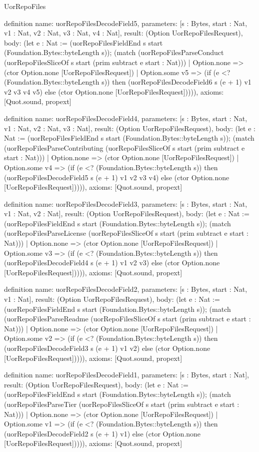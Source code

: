 \begin{lexlean}{UorRepoFiles}
\begin{semanticmodule}
definition{
  name: uorRepoFilesDecodeField5,
  parameters: [s : Bytes, start : Nat, v1 : Nat, v2 : Nat, v3 : Nat, v4 : Nat],
  result: (Option UorRepoFilesRequest),
  body: (let e : Nat := (uorRepoFilesFieldEnd s start (Foundation.Bytes::byteLength s)); (match (uorRepoFilesParseConduct (uorRepoFilesSliceOf s start (prim subtract e start : Nat)))
    | Option.none => (ctor Option.none [UorRepoFilesRequest])
    | Option.some v5 => (if (e <? (Foundation.Bytes::byteLength s)) then (uorRepoFilesDecodeField6 s (e + 1) v1 v2 v3 v4 v5) else (ctor Option.none [UorRepoFilesRequest])))),
  axioms: [Quot.sound, propext]
}

definition{
  name: uorRepoFilesDecodeField4,
  parameters: [s : Bytes, start : Nat, v1 : Nat, v2 : Nat, v3 : Nat],
  result: (Option UorRepoFilesRequest),
  body: (let e : Nat := (uorRepoFilesFieldEnd s start (Foundation.Bytes::byteLength s)); (match (uorRepoFilesParseContributing (uorRepoFilesSliceOf s start (prim subtract e start : Nat)))
    | Option.none => (ctor Option.none [UorRepoFilesRequest])
    | Option.some v4 => (if (e <? (Foundation.Bytes::byteLength s)) then (uorRepoFilesDecodeField5 s (e + 1) v1 v2 v3 v4) else (ctor Option.none [UorRepoFilesRequest])))),
  axioms: [Quot.sound, propext]
}

definition{
  name: uorRepoFilesDecodeField3,
  parameters: [s : Bytes, start : Nat, v1 : Nat, v2 : Nat],
  result: (Option UorRepoFilesRequest),
  body: (let e : Nat := (uorRepoFilesFieldEnd s start (Foundation.Bytes::byteLength s)); (match (uorRepoFilesParseLicense (uorRepoFilesSliceOf s start (prim subtract e start : Nat)))
    | Option.none => (ctor Option.none [UorRepoFilesRequest])
    | Option.some v3 => (if (e <? (Foundation.Bytes::byteLength s)) then (uorRepoFilesDecodeField4 s (e + 1) v1 v2 v3) else (ctor Option.none [UorRepoFilesRequest])))),
  axioms: [Quot.sound, propext]
}

definition{
  name: uorRepoFilesDecodeField2,
  parameters: [s : Bytes, start : Nat, v1 : Nat],
  result: (Option UorRepoFilesRequest),
  body: (let e : Nat := (uorRepoFilesFieldEnd s start (Foundation.Bytes::byteLength s)); (match (uorRepoFilesParseReadme (uorRepoFilesSliceOf s start (prim subtract e start : Nat)))
    | Option.none => (ctor Option.none [UorRepoFilesRequest])
    | Option.some v2 => (if (e <? (Foundation.Bytes::byteLength s)) then (uorRepoFilesDecodeField3 s (e + 1) v1 v2) else (ctor Option.none [UorRepoFilesRequest])))),
  axioms: [Quot.sound, propext]
}

definition{
  name: uorRepoFilesDecodeField1,
  parameters: [s : Bytes, start : Nat],
  result: (Option UorRepoFilesRequest),
  body: (let e : Nat := (uorRepoFilesFieldEnd s start (Foundation.Bytes::byteLength s)); (match (uorRepoFilesParseTier (uorRepoFilesSliceOf s start (prim subtract e start : Nat)))
    | Option.none => (ctor Option.none [UorRepoFilesRequest])
    | Option.some v1 => (if (e <? (Foundation.Bytes::byteLength s)) then (uorRepoFilesDecodeField2 s (e + 1) v1) else (ctor Option.none [UorRepoFilesRequest])))),
  axioms: [Quot.sound, propext]
}


\end{semanticmodule}
\end{lexlean}
